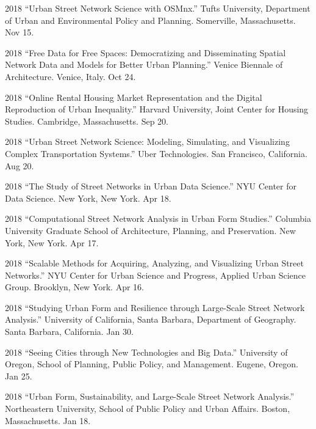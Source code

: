 \documentclass[12pt,letterpaper]{report}
\begin{document}
\begin{tablist}
        \item[2018] \tab{}\enquote{Urban Street Network Science with OSMnx.} Tufts University, Department of Urban and Environmental Policy and Planning. Somerville, Massachusetts. Nov 15.

        \item[2018] \tab{}\enquote{Free Data for Free Spaces: Democratizing and Disseminating Spatial Network Data and Models for Better Urban Planning.} Venice Biennale of Architecture. Venice, Italy. Oct 24.

        \item[2018] \tab{}\enquote{Online Rental Housing Market Representation and the Digital Reproduction of Urban Inequality.} Harvard University, Joint Center for Housing Studies. Cambridge, Massachusetts. Sep 20.

        \item[2018] \tab{}\enquote{Urban Street Network Science: Modeling, Simulating, and Visualizing Complex Transportation Systems.} Uber Technologies. San Francisco, California. Aug 20.

        \item[2018] \tab{}\enquote{The Study of Street Networks in Urban Data Science.} NYU Center for Data Science. New York, New York. Apr 18.

        \item[2018] \tab{}\enquote{Computational Street Network Analysis in Urban Form Studies.} Columbia University Graduate School of Architecture, Planning, and Preservation. New York, New York. Apr 17.

        \item[2018] \tab{}\enquote{Scalable Methods for Acquiring, Analyzing, and Visualizing Urban Street Networks.} NYU Center for Urban Science and Progress, Applied Urban Science Group. Brooklyn, New York. Apr 16.

        \item[2018] \tab{}\enquote{Studying Urban Form and Resilience through Large-Scale Street Network Analysis.} University of California, Santa Barbara, Department of Geography. Santa Barbara, California. Jan 30.

        \item[2018] \tab{}\enquote{Seeing Cities through New Technologies and Big Data.} University of Oregon, School of Planning, Public Policy, and Management. Eugene, Oregon. Jan 25.

        \item[2018] \tab{}\enquote{Urban Form, Sustainability, and Large-Scale Street Network Analysis.} Northeastern University, School of Public Policy and Urban Affairs. Boston, Massachusetts. Jan 18.


\end{tablist}
\end{document}
